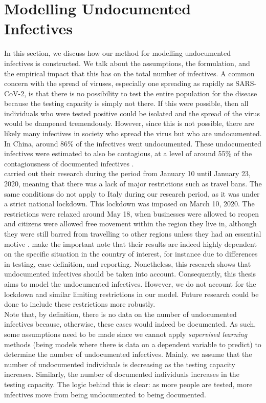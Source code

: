 \documentclass[12pt]{article}
\begin{document}
	\section{Modelling Undocumented Infectives} \label{sec:undocumented_modelling}
	In this section, we discuss how our method for modelling undocumented infectives is constructed. We talk about the assumptions, the formulation, and the empirical impact that this has on the total number of infectives. A common concern with the spread of viruses, especially one spreading as rapidly as SARS-CoV-2, is that there is no possibility to test the entire population for the disease because the testing capacity is simply not there. If this were possible, then all individuals who were tested positive could be isolated and the spread of the virus would be dampened tremendously. However, since this is not possible, there are likely many infectives in society who spread the virus but who are undocumented. In China, around 86\% of the infectives went undocumented. These undocumented infectives were estimated to also be contagious, at a level of around 55\% of the contagiousness of documented infectives \parencite{li2020undocumented}. \\
	
	\textcite{li2020undocumented} carried out their research during the period from January 10 until January 23, 2020, meaning that there was a lack of major restrictions such as travel bans. The same conditions do not apply to Italy during our research period, as it was under a strict national lockdown. This lockdown was imposed on March 10, 2020. The restrictions were relaxed around May 18, when businesses were allowed to reopen and citizens were allowed free movement within the region they live in, although they were still barred from travelling to other regions unless they had an essential motive \parencite{severgnini2020relaxLockdown}. \textcite{li2020undocumented} make the important note that their results are indeed highly dependent on the specific situation in the country of interest, for instance due to differences in testing, case definition, and reporting. Nonetheless, this research shows that undocumented infectives should be taken into account. Consequently, this thesis aims to model the undocumented infectives. However, we do not account for the lockdown and similar limiting restrictions in our model. Future research could be done to include these restrictions more robustly. \\
	
	Note that, by definition, there is no data on the number of undocumented infectives because, otherwise, these cases would indeed be documented. As such, some assumptions need to be made since we cannot apply \textit{supervised learning} methods (being models where there is data on a dependent variable to predict) to determine the number of undocumented infectives. Mainly, we assume that the number of undocumented individuals is decreasing as the testing capacity increases. Similarly, the number of documented individuals increases in the testing capacity. The logic behind this is clear: as more people are tested, more infectives move from being undocumented to being documented. \\
	
\end{document}
